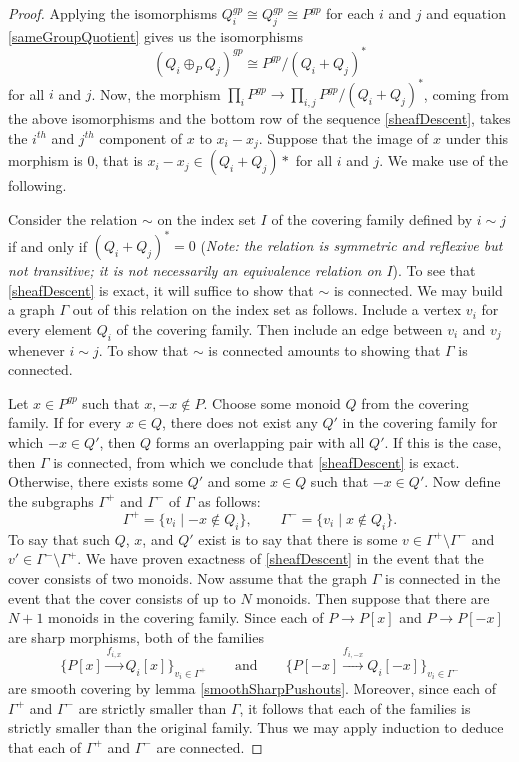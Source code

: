 \documentclass[12pt]{amsart}
\numberwithin{equation}{section}
\theoremstyle{plain}
\theoremstyle{remark}
\begin{document}
\begin{proof}
Applying the isomorphisms $Q_i^{gp}\cong Q_j^{gp} \cong P^{gp}$ for each $i$ and $j$ and equation \eqref{sameGroupQuotient} gives us the isomorphisms
	$$(Q_i\oplus_P Q_j)^{gp} \cong P^{gp}/(Q_i + Q_j)^*$$
for all $i$ and $j$. Now, the morphism $\prod_i P^{gp} \rightarrow \prod_{i,j}P^{gp}/(Q_i + Q_j)^*$, coming from the above isomorphisms and the bottom row of the sequence \eqref{sheafDescent},
takes the $i^{th}$ and $j^{th}$ component of $x$ to $x_i - x_j$. Suppose that the image of $x$ under this morphism is $0$, that is $x_i - x_j \in (Q_i + Q_j)*$ for all $i$ and $j$. We make use of the following.


Consider the relation $\sim$ on the index set $I$ of the covering family defined by $i\sim j$ if and only if $(Q_i + Q_j)^* = 0$  (\emph{Note: the relation is symmetric and reflexive but not transitive; it is not necessarily an equivalence relation on $I$}). To see that \eqref{sheafDescent} is exact, it will suffice to show that $\sim$ is connected. We may build a graph $\Gamma$ out of this relation on the index set as follows. Include a vertex $v_i$ for every element $Q_i$ of the covering family. Then include an edge between $v_i$ and $v_j$ whenever $i\sim j$. To show that $\sim$ is connected amounts to showing that $\Gamma$ is connected. 

Let $x\in P^{gp}$ such that $x,-x\not\in P$. Choose some monoid $Q$ from the covering family. If for every $x\in Q$, there does not exist any $Q'$ in the covering family for which $-x\in Q'$, then $Q$ forms an overlapping pair with all $Q'$. If this is the case, then $\Gamma$ is connected, from which we conclude that \eqref{sheafDescent} is exact. Otherwise, there exists some $Q'$ and some $x\in Q$ such that $-x\in Q'$. Now define the subgraphs $\Gamma^+$ and $\Gamma^-$ of $\Gamma$ as follows:
	$$\Gamma^+ = \{v_i\mid -x\not\in Q_i\},\qquad \Gamma^- = \{v_i\mid x\not\in Q_i\}.$$
To say that such $Q$, $x$, and $Q'$ exist is to say that there is some $v\in \Gamma^+\setminus \Gamma^-$ and $v'\in \Gamma^-\setminus\Gamma^+$. We have proven exactness of \eqref{sheafDescent} in the event that the cover consists of two monoids. Now assume that the graph $\Gamma$ is connected in the event that the cover consists of up to $N$ monoids. Then suppose that there are $N+1$ monoids in the covering family. Since each of $P\to P[x]$ and $P\to P[-x]$ are sharp morphisms, both of the families
	$$\{P[x]\xrightarrow{f_{i,x}} Q_i[x]\}_{v_i\in\Gamma^+} \qquad\text{and}\qquad \{P[-x]\xrightarrow{f_{i,-x}} Q_i[-x]\}_{ v_i\in\Gamma^-}$$
are smooth covering by lemma \eqref{smoothSharpPushouts}. Moreover, since each of $\Gamma^+$ and $\Gamma^-$ are strictly smaller than $\Gamma$, it follows that each of the families is strictly smaller than the original family. Thus we may apply induction to deduce that each of $\Gamma^+$ and $\Gamma^-$ are connected. 


\end{proof}
\end{document}
